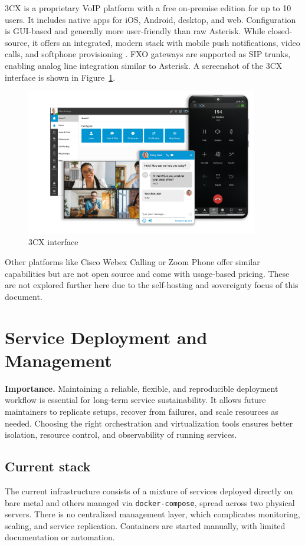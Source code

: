 3CX is a proprietary VoIP platform with a free on-premise edition for up to 10 users. It includes native apps for iOS, Android, desktop, and web. Configuration is GUI-based and generally more user-friendly than raw Asterisk. While closed-source, it offers an integrated, modern stack with mobile push notifications, video calls, and softphone provisioning \cite{3CXPricing2024,3CXMarketing2024}. FXO gateways are supported as SIP trunks, enabling analog line integration similar to Asterisk. A screenshot of the 3CX interface is shown in Figure~\ref{fig:3cx-ui}.

\begin{figure}[H]
  \centering
  \includegraphics[width=0.9\textwidth]{imaxes/3cx-ui.png}
  \caption{3CX interface}
  \label{fig:3cx-ui}
\end{figure}

Other platforms like Cisco Webex Calling or Zoom Phone offer similar capabilities but are not open source and come with usage-based pricing. These are not explored further here due to the self-hosting and sovereignty focus of this document.

\section{Service Deployment and Management}

\textbf{Importance.} Maintaining a reliable, flexible, and reproducible deployment workflow is essential for long-term service sustainability. It allows future maintainers to replicate setups, recover from failures, and scale resources as needed. Choosing the right orchestration and virtualization tools ensures better isolation, resource control, and observability of running services.

\subsection{Current stack}
The current infrastructure consists of a mixture of services deployed directly on bare metal and others managed via \texttt{docker-compose}, spread across two physical servers. There is no centralized management layer, which complicates monitoring, scaling, and service replication. Containers are started manually, with limited documentation or automation.

